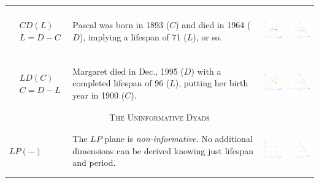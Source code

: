 \documentclass[
  12pt
]{scrartcl}
\begin{document}
\begin{center}
\begin{longtable}{m{}m{}m{}m{}}
  $$\begin{aligned}
    &CD(L) \\
    &L = D - C
  \end{aligned}$$ &
  Pascal was born in 1893 ($C$) and died in 1964 ($D$), implying a lifespan of 71 ($L$), or so. &
  \includegraphics[height = 2cm]{../fig/CDl.pdf} &
  \includegraphics[height = 2cm]{../fig/CDl_iso.pdf}  \\
  $$\begin{aligned}
    &LD(C) \\
    &C = D - L
  \end{aligned}$$ &
  Margaret died in Dec., 1995 ($D$) with a completed lifespan of 96 ($L$), putting her birth year in 1900 ($C$). &
  \includegraphics[height = 2cm]{../fig/LDc.pdf} &
  \includegraphics[height = 2cm]{../fig/LDc_iso.pdf}  \\
  \midrule
  \multicolumn{4}{c}{\textsc{The Uninformative Dyads}} \\
  \midrule
  $LP(-)$ &
  The $LP$ plane is \emph{non-informative}. No additional dimensions can be derived knowing just lifespan and period. &
  \includegraphics[height = 2cm]{../fig/LP.pdf} &
  \includegraphics[height = 2cm]{../fig/LP_iso.pdf}  \\

\end{longtable}
\end{center}
\end{document}
